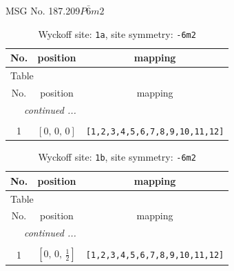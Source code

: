 \documentclass[fleqn,8pt]{jsarticle}
\begin{document}
\setcounter{MaxMatrixCols}{32}

\renewcommand{\tablename}{Table~}
\renewcommand{\figurename}{Figure~}
\begin{center}
\LARGE
MSG No. 187.209\quad$P\bar{6}m2$
\end{center}
\renewcommand{\arraystretch}{1.2}
\begin{longtable}{ccc}
\caption{Wyckoff site: {\tt 1a}, site symmetry: {\tt -6m2}}
 \\
 \hline \hline
No. & position & mapping \\ \hline \endfirsthead

\multicolumn{2}{l}{\tablename\ \thetable{}} \\
 \hline \hline
No. & position & mapping \\ \hline \endhead

 \hline \hline
\multicolumn{2}{r}{\footnotesize\it continued ...} \\ \endfoot

 \hline \hline
\multicolumn{2}{r}{} \\ \endlastfoot

1 & $\left[ 0,\, 0,\, 0 \right]$ & {\tt [1,2,3,4,5,6,7,8,9,10,11,12]} \\
\end{longtable}
\renewcommand{\arraystretch}{1.2}
\begin{longtable}{ccc}
\caption{Wyckoff site: {\tt 1b}, site symmetry: {\tt -6m2}}
 \\
 \hline \hline
No. & position & mapping \\ \hline \endfirsthead

\multicolumn{2}{l}{\tablename\ \thetable{}} \\
 \hline \hline
No. & position & mapping \\ \hline \endhead

 \hline \hline
\multicolumn{2}{r}{\footnotesize\it continued ...} \\ \endfoot

 \hline \hline
\multicolumn{2}{r}{} \\ \endlastfoot

1 & $\left[ 0,\, 0,\, \frac{1}{2} \right]$ & {\tt [1,2,3,4,5,6,7,8,9,10,11,12]} \\
\end{longtable}
\renewcommand{\arraystretch}{1.2}
\end{document}

